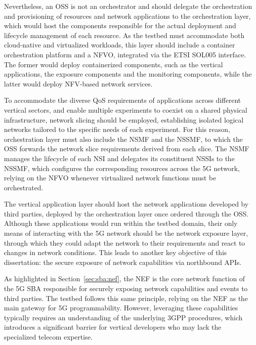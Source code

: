 Nevertheless, an \acs{OSS} is not an orchestrator and should delegate the orchestration and provisioning of resources and network applications to the orchestration layer, which would host the components responsible for the actual deployment and lifecycle management of each resource. As the testbed must accommodate both cloud-native and virtualized workloads, this layer should include a container orchestration platform and a \acs{NFVO}, integrated via the \acs{ETSI} \acs{SOL}005 interface. The former would deploy containerized components, such as the vertical applications, the exposure components and the monitoring components, while the latter would deploy \acs{NFV}-based network services.

To accommodate the diverse \acs{QoS} requirements of applications across different vertical sectors, and enable multiple experiments to coexist on a shared physical infrastructure, network slicing should be employed, establishing isolated logical networks tailored to the specific needs of each experiment. For this reason, orchestration layer must also include the \acs{NSMF} and the \acs{NSSMF}, to which the \acs{OSS} forwards the network slice requirements derived from each slice. The \acs{NSMF} manages the lifecycle of each \acs{NSI} and delegates its constituent \acsp{NSSI} to the \acs{NSSMF}, which configures the corresponding resources across the \acs{5G} network, relying on the \acs{NFVO} whenever virtualized network functions must be orchestrated.

The vertical application layer should host the network applications developed by third parties, deployed by the orchestration layer once ordered through the \acs{OSS}. Although these applications would run within the testbed domain, their only means of interacting with the \acs{5G} network should be the network exposure layer, through which they could adapt the network to their requirements and react to changes in network conditions. This leads to another key objective of this dissertation: the secure exposure of network capabilities via northbound \acsp{API}.

As highlighted in Section~\ref{sec:sba:nef}, the \acs{NEF} is the core network function of the \acs{5G} \acs{SBA} responsible for securely exposing network capabilities and events to third parties. The testbed follows this same principle, relying on the \acs{NEF} as the main gateway for \acs{5G} programmability. However, leveraging these capabilities typically requires an understanding of the underlying \acs{3GPP} procedures, which introduces a significant barrier for vertical developers who may lack the specialized telecom expertise.


